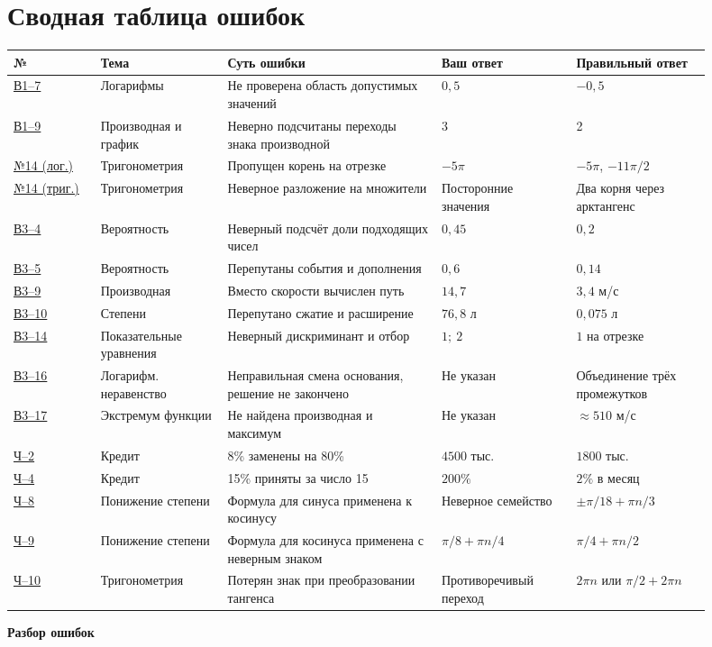 \documentclass[11pt,a4paper]{article}
\begin{document}
\section*{Сводная таблица ошибок}
\small
\renewcommand{\arraystretch}{1.35}
\begin{longtable}{@{}p{0.115\linewidth}p{0.165\linewidth}p{0.27\linewidth}p{0.175\linewidth}p{0.175\linewidth}@{}}
\toprule
№ & Тема & Суть ошибки & Ваш ответ & Правильный ответ\\\midrule\endhead
\hyperref[task:v17]{В1--7} & Логарифмы & Не проверена область допустимых значений & $0{,}5$ & $-0{,}5$\\
\hyperref[task:v19]{В1--9} & Производная и график & Неверно подсчитаны переходы знака производной & 3 & 2\\
\hyperref[task:v114l]{№14 (лог.)} & Тригонометрия & Пропущен корень на отрезке & $-5\pi$ & $-5\pi$, $-11\pi/2$\\
\hyperref[task:v114t]{№14 (триг.)} & Тригонометрия & Неверное разложение на множители & Посторонние значения & Два корня через арктангенс\\
\hyperref[task:v34]{В3--4} & Вероятность & Неверный подсчёт доли подходящих чисел & $0{,}45$ & $0{,}2$\\
\hyperref[task:v35]{В3--5} & Вероятность & Перепутаны события и дополнения & $0{,}6$ & $0{,}14$\\
\hyperref[task:v39]{В3--9} & Производная & Вместо скорости вычислен путь & $14{,}7$ & $3{,}4$ м/с\\
\hyperref[task:v310]{В3--10} & Степени & Перепутано сжатие и расширение & $76{,}8$ л & $0{,}075$ л\\
\hyperref[task:v314]{В3--14} & Показательные уравнения & Неверный дискриминант и отбор & $1;\ 2$ & $1$ на отрезке\\
\hyperref[task:v316]{В3--16} & Логарифм. неравенство & Неправильная смена основания, решение не закончено & Не указан & Объединение трёх промежутков\\
\hyperref[task:v317]{В3--17} & Экстремум функции & Не найдена производная и максимум & Не указан & $\approx510$ м/с\\
\hyperref[task:c2]{Ч--2} & Кредит & 8\% заменены на 80\% & $4500$ тыс. & $1800$ тыс.\\
\hyperref[task:c4]{Ч--4} & Кредит & 15\% приняты за число 15 & $200\%$ & $2\%$ в месяц\\
\hyperref[task:c8]{Ч--8} & Понижение степени & Формула для синуса применена к косинусу & Неверное семейство & $\pm\pi/18+\pi n/3$\\
\hyperref[task:c9]{Ч--9} & Понижение степени & Формула для косинуса применена с неверным знаком & $\pi/8+\pi n/4$ & $\pi/4+\pi n/2$\\
\hyperref[task:c10]{Ч--10} & Тригонометрия & Потерян знак при преобразовании тангенса & Противоречивый переход & $2\pi n$ или $\pi/2+2\pi n$\\
\bottomrule
\end{longtable}
\normalsize
\clearpage
\vspace*{0.38\textheight}\begin{center}\Huge\bfseries Разбор ошибок\end{center}
\end{document}
